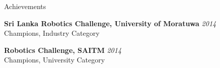 \documentclass[
11pt, %
]{./assets/resume} %
\begin{document}
	



 
\begin{rSection}{Achievements}

	\textbf{Sri Lanka Robotics Challenge, University of Moratuwa} \hfill \textit{2014}\\
	Champions, Industry Category

	\textbf{Robotics Challenge, SAITM} \hfill \textit{2014}\\
	Champions, University Category
	\\
	\\
	\\

\end{rSection}



\end{document}
